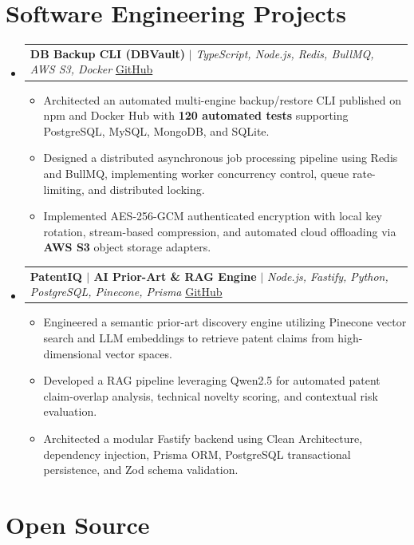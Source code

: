 \documentclass[letterpaper,10.5pt]{article}
\makeatletter
\newcommand{\resumeItem}[1]{
  \item\small{#1\vspace{-1pt}}
}
\newcommand{\resumeProjectHeading}[2]{
  \item
  \begin{tabular*}{0.97\textwidth}[t]{l@{\extracolsep{\fill}}r}
    \small#1 & #2 \\
  \end{tabular*}
  \vspace{1pt}
}
\newcommand{\resumeSubHeadingListStart}{
\begin{itemize}[
    leftmargin=0.15in,
    label={},
    itemsep=2pt,
    parsep=0pt,
    topsep=3pt,
    partopsep=0pt
]
}
\newcommand{\resumeSubHeadingListEnd}{
\end{itemize}
\vspace{-2pt}
}
\newcommand{\resumeItemListStart}{
\begin{itemize}[
    itemsep=1pt,
    parsep=0pt,
    topsep=1pt,
    partopsep=0pt,
    leftmargin=0.18in
]
}
\newcommand{\resumeItemListEnd}{
\end{itemize}
\vspace{-2pt}
}
\makeatother
\begin{document}
\section{Software Engineering Projects}

\resumeSubHeadingListStart

\resumeProjectHeading
{\textbf{DB Backup CLI (DBVault)} $|$ \emph{TypeScript, Node.js, Redis, BullMQ, AWS S3, Docker}
\hfill
\href{https://github.com/rithishcodespace/db-backup-cli}{GitHub}}{}

\resumeItemListStart

    \resumeItem{Architected an automated multi-engine backup/restore CLI published on npm and Docker Hub with \textbf{120 automated tests} supporting PostgreSQL, MySQL, MongoDB, and SQLite.}

    \resumeItem{Designed a distributed asynchronous job processing pipeline using Redis and BullMQ, implementing worker concurrency control, queue rate-limiting, and distributed locking.}

    \resumeItem{Implemented AES-256-GCM authenticated encryption with local key rotation, stream-based compression, and automated cloud offloading via \textbf{AWS S3} object storage adapters.}

\resumeItemListEnd

\resumeProjectHeading
{\textbf{PatentIQ $|$ AI Prior-Art \& RAG Engine} $|$
\emph{Node.js, Fastify, Python, PostgreSQL, Pinecone, Prisma}
\hfill
\href{https://github.com/rithishcodespace/PatentIQ}{GitHub}}{}

\resumeItemListStart

    \resumeItem{Engineered a semantic prior-art discovery engine utilizing Pinecone vector search and LLM embeddings to retrieve patent claims from high-dimensional vector spaces.}

    \resumeItem{Developed a RAG pipeline leveraging Qwen2.5 for automated patent claim-overlap analysis, technical novelty scoring, and contextual risk evaluation.}

    \resumeItem{Architected a modular Fastify backend using Clean Architecture, dependency injection, Prisma ORM, PostgreSQL transactional persistence, and Zod schema validation.}

\resumeItemListEnd

\resumeSubHeadingListEnd

\section{Open Source}
\end{document}
